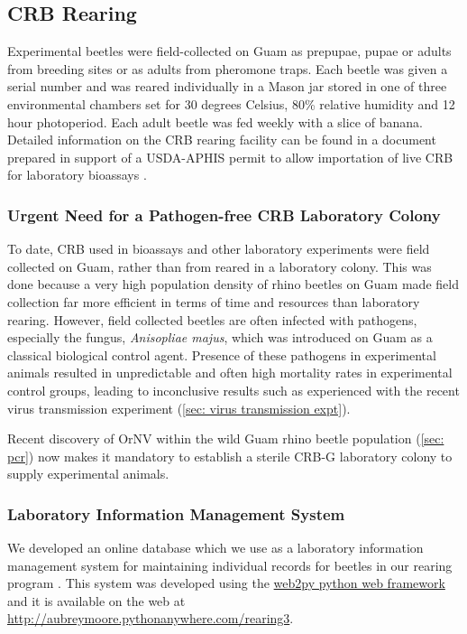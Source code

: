 \documentclass[12pt,
letterpaper,english,bibliography=totocnumbered, abstract=on]{scrartcl}
\begin{document}
\clearpage
\subsection{CRB Rearing}
\label{sec: rearing}

Experimental beetles were field-collected on Guam as prepupae, pupae or adults from breeding sites or as adults from pheromone traps.  Each beetle was given a serial number and was reared individually in a Mason jar stored in one of three environmental chambers set for 30 degrees Celsius, 80\% relative humidity and 12 hour photoperiod. Each adult beetle was fed weekly with a slice of banana. Detailed information on the CRB rearing facility can be found in a document prepared in support of a USDA-APHIS permit to allow importation of live CRB for laboratory bioassays \parencite{moore_additional_2019}.

\subsubsection{Urgent Need for a Pathogen-free CRB Laboratory Colony} 

To date, CRB used in bioassays and other laboratory experiments were field collected on Guam, rather than from reared in a laboratory colony. This was done because a very high population density of rhino beetles on Guam made field collection far more efficient in terms of time and resources than laboratory rearing. However, field collected beetles are often infected with pathogens, especially the fungus, \textit{Anisopliae majus}, which was introduced on Guam as a classical biological control agent. Presence of these pathogens in experimental animals resulted in unpredictable and often high mortality rates in experimental control groups, leading to inconclusive results  such as experienced with the recent virus transmission experiment (\ref{sec: virus transmission expt}).

Recent discovery of OrNV within the wild Guam rhino beetle population (\ref{sec: pcr}) now makes it mandatory to establish a sterile CRB-G laboratory colony to supply experimental animals.

\subsubsection{Laboratory Information Management System}\label{lims}

We developed an online database which we use as a laboratory information management system for maintaining individual records for beetles in our rearing program \parencite{moore_coconut_2019-1}. This system was developed using the \href{http://www.web2py.com/}{web2py python web framework} and it is available on the web at \url{http://aubreymoore.pythonanywhere.com/rearing3}. 
\end{document}
